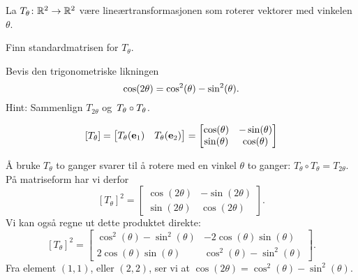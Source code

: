 


\begin{oppgave}
La $T_\theta \colon \mathbb{R}^2 \to \mathbb{R}^2$ være lineærtransformasjonen som
roterer vektorer med vinkelen $\theta$.

\begin{punkt}
Finn standardmatrisen for $T_\theta$.
\end{punkt}

\begin{punkt}
Bevis den trigonometriske likningen
\vspace{-4pt}
\[
\cos(2\theta)=\cos^2(\theta)-\sin^2 (\theta).
\vspace{-3pt}
\]
Hint: Sammenlign $T_{2\theta}$ og~$T_{\theta} \circ T_{\theta}$.
\end{punkt}


\end{oppgave}

\begin{losning}

\begin{punkt}
$$[T_\theta]=\begin{bmatrix}
T_\theta(\mathbf{e}_1) & T_\theta(\mathbf{e}_2)
\end{bmatrix} = \begin{bmatrix}
\cos(\theta) & -\sin(\theta)\\
\sin(\theta) & \cos(\theta)
\end{bmatrix}$$

\end{punkt}

\begin{punkt}
Å bruke $T_\theta$ to ganger svarer til å rotere med en vinkel $\theta$ to ganger: $T_\theta \circ T_\theta=T_{2\theta}$.
På matriseform har vi derfor $$[T_\theta]^2= \begin{bmatrix}
\cos(2\theta) & -\sin(2\theta)\\
\sin(2\theta) & \cos(2\theta)
\end{bmatrix}.$$ Vi kan også regne ut dette produktet direkte:
$$[T_\theta]^2=\begin{bmatrix}
\cos^2(\theta)-\sin^2(\theta) & -2\cos(\theta)\sin(\theta)\\
2\cos(\theta)\sin(\theta) & \cos^2(\theta)-\sin^2(\theta)
\end{bmatrix}.$$ Fra element $(1,1)$, eller $(2,2)$, ser vi at $\cos(2\theta)=\cos^2(\theta)-\sin^2(\theta)$.

\end{punkt}

\end{losning}


